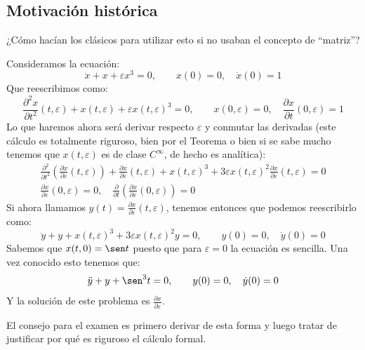 \subsection{Motivación histórica}
\noindent
¿Cómo hacían los clásicos para utilizar esto si no usaban el concepto de ``matriz''?
\begin{ejemplo}
    Consideramos la ecuación:
    \begin{equation*}
        \ddot{x} + x + \varepsilon x^3 = 0, \qquad x(0) = 0, \quad \dot{x}(0) = 1
    \end{equation*}
    Que reescribimos como:
    \begin{equation*}
        \frac{\partial^2 x}{\partial t^2}(t,\varepsilon) + x(t,\varepsilon) + \varepsilon x(t,\varepsilon)^3 = 0, \qquad x(0,\varepsilon) = 0, \quad \frac{\partial x}{\partial t}(0,\varepsilon) = 1
    \end{equation*}
    Lo que haremos ahora será derivar respecto $\varepsilon$ y conmutar las derivadas (este cálculo es totalmente riguroso, bien por el Teorema o bien si se sabe mucho tenemos que $x(t,\varepsilon)$ es de clase $C^\infty$, de hecho es analítica):
    \begin{multline*}
        \frac{\partial^2 }{\partial t^2}\left(\frac{\partial x}{\partial \varepsilon}(t,\varepsilon)\right) + \frac{\partial x}{\partial \varepsilon}(t,\varepsilon) + x(t,\varepsilon)^3 + 3\varepsilon x(t,\varepsilon)^2 \frac{\partial x}{\partial \varepsilon}(t,\varepsilon) = 0 \\
        \frac{\partial x}{\partial \varepsilon}(0,\varepsilon) = 0, \quad \frac{\partial }{\partial t}\left(\frac{\partial x}{\partial \varepsilon}\left(0,\varepsilon\right)\right) = 0
    \end{multline*}
    Si ahora llamamos $y(t) = \frac{\partial x}{\partial \varepsilon}(t,\varepsilon)$, tenemos entonces que podemos reescribirlo como:
    \begin{equation*}
        \ddot{y} + y + x(t,\varepsilon)^3 + 3\varepsilon x(t,\varepsilon)^2 y = 0, \qquad y(0) = 0, \quad \dot{y}(0) = 0
    \end{equation*}
    Sabemos que $x(t,0) = \sen t$ puesto que para $\varepsilon=0$ la ecuación es sencilla. Una vez conocido esto tenemos que:
    \begin{equation*}
        \ddot{y} + y + \sen^3 t = 0, \qquad y(0) = 0,\quad \dot{y}(0) = 0
    \end{equation*}
    Y la solución de este problema es $\frac{\partial x}{\partial \varepsilon}$.
\end{ejemplo}
\noindent
El consejo para el examen es primero derivar de esta forma y luego tratar de justificar por qué es riguroso el cálculo formal.

